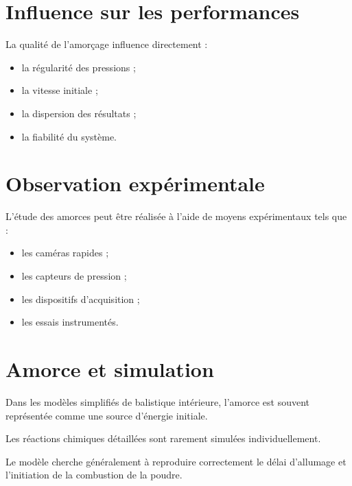 \section{Influence sur les performances}

La qualité de l'amorçage influence directement :

\begin{itemize}
    \item la régularité des pressions ;
    \item la vitesse initiale ;
    \item la dispersion des résultats ;
    \item la fiabilité du système.
\end{itemize}

\section{Observation expérimentale}

L'étude des amorces peut être réalisée à l'aide de moyens expérimentaux tels
que :

\begin{itemize}
    \item les caméras rapides ;
    \item les capteurs de pression ;
    \item les dispositifs d'acquisition ;
    \item les essais instrumentés.
\end{itemize}

\section{Amorce et simulation}

\begin{simulation}

Dans les modèles simplifiés de balistique intérieure, l'amorce est souvent
représentée comme une source d'énergie initiale.

Les réactions chimiques détaillées sont rarement simulées individuellement.

Le modèle cherche généralement à reproduire correctement le délai d'allumage
et l'initiation de la combustion de la poudre.

\end{simulation}

